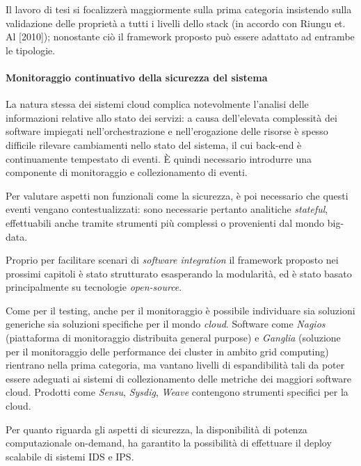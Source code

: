 \documentclass[../main.tex]{subfiles}
\begin{document}
Il lavoro di tesi si focalizzerà maggiormente sulla prima categoria insistendo sulla validazione delle proprietà a tutti i livelli dello stack (in accordo con Riungu et. Al [2010]); nonostante ciò il framework proposto può essere adattato ad entrambe le tipologie.


\paragraph{Monitoraggio continuativo della sicurezza del sistema}
La natura stessa dei sistemi cloud complica notevolmente l'analisi delle informazioni relative allo stato dei servizi: a causa dell'elevata complessità dei software impiegati nell'orchestrazione e nell'erogazione delle risorse è spesso difficile rilevare cambiamenti nello stato del sistema, il cui back-end è continuamente tempestato di eventi.
È quindi necessario introdurre una componente di monitoraggio e collezionamento di eventi.


Per valutare aspetti non funzionali come la sicurezza, è poi necessario che questi eventi vengano contestualizzati: sono necessarie pertanto analitiche \textit{stateful}, effettuabili anche tramite strumenti più complessi o provenienti dal mondo big-data. 


Proprio per facilitare scenari di \textit{software integration} il framework proposto nei prossimi capitoli è stato strutturato esasperando la modularità, ed è stato basato principalmente su tecnologie \textit{open-source}.


Come per il testing, anche per il monitoraggio è possibile individuare sia soluzioni generiche sia soluzioni specifiche per il mondo \textit{cloud}. Software come \textit{Nagios} (piattaforma di monitoraggio distribuita general purpose) e \textit{Ganglia} (soluzione per il monitoraggio delle performance dei cluster in ambito grid computing) rientrano nella prima categoria, ma vantano livelli di espandibilità tali da poter essere adeguati ai sistemi di collezionamento delle metriche dei maggiori software cloud.
Prodotti come \textit{Sensu}, \textit{Sysdig}, \textit{Weave} contengono strumenti specifici per la cloud.


Per quanto riguarda gli aspetti di sicurezza, la disponibilità di potenza computazionale on-demand, ha garantito la possibilità di effettuare il deploy scalabile di sistemi IDS e IPS.
\end{document}
